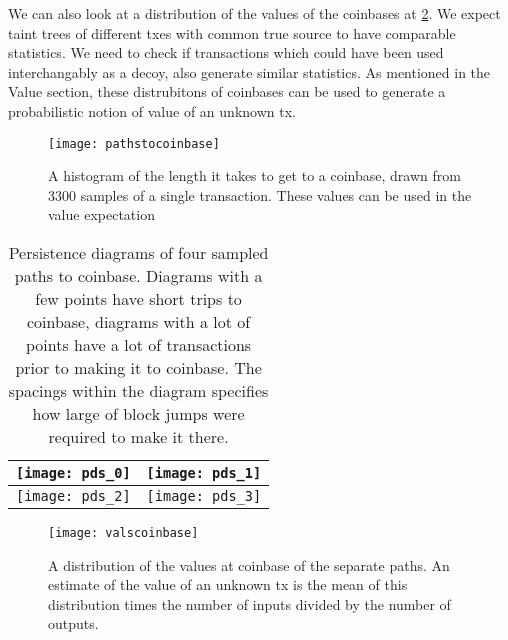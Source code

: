 We can also look at a distribution of the values of the coinbases at \ref{fig:valsc}.
We expect taint trees of different txes with common true source to have comparable statistics.  
We need to check if transactions which could have been used interchangably as a decoy, also generate similar statistics.
As mentioned in the Value section, these distrubitons of coinbases can be used to generate a probabilistic notion of value of an unknown tx.

\begin{figure}[h]
\texttt{[image: pathstocoinbase]}
\caption{A histogram of the length it takes to get to a coinbase, drawn from 3300 samples of a single transaction.  These values can be used in the value expectation}
\label{fig:ptoc}
\end{figure}

\begin{center}
\begin{table}
\begin{tabular}{|c|c|}

\hline
 \texttt{[image: pds\_0]} & \texttt{[image: pds\_1]}  \\ \hline
  \texttt{[image: pds\_2]} & \texttt{[image: pds\_3]}  \\ \hline
\end{tabular}
\caption{Persistence diagrams of four sampled paths to coinbase.  Diagrams with a few points have short trips to coinbase, diagrams with a lot of points have a lot of transactions prior to making it to coinbase.  The spacings within the diagram specifies how large of block jumps were required to make it there.}
\label{tab:pdsSP}
\end{table}
\end{center}

\begin{figure}[h]
\texttt{[image: valscoinbase]}
\caption{A distribution of the values at coinbase of the separate paths.  
An estimate of the value of an unknown tx is the mean of this distribution times the number of inputs divided by the number of outputs.}
\label{fig:valsc}
\end{figure}
